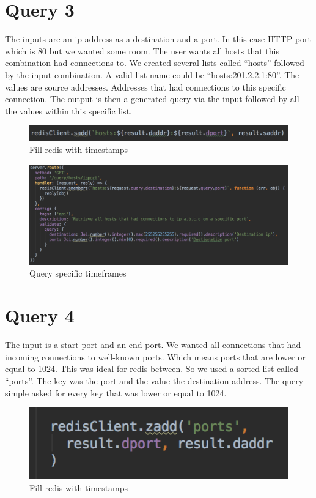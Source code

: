 \section{Query 3}
The inputs are an ip address as a destination and a port. In this case HTTP port which is 80 but we wanted some room. The user wants all hosts that this combination had connections to. We created several lists called “hosts” followed by the input combination. A valid list name could be “hosts:201.2.2.1:80”. The values are source addresses. Addresses that had connections to this specific connection. The output is then a generated query via the input followed by all the values within this specific list.

  \begin{figure}[htb!]
	\centerline{\includegraphics[width=1.0\textwidth]{resources/solution2-6.png}}
	\caption{Fill redis with timestamps}
	\label{query3}
\end{figure}

\begin{figure}[htb!]
	\centerline{\includegraphics[width=1.0\textwidth]{resources/solution2-7.png}}
	\caption{Query specific timeframes}
	\label{query33}
\end{figure}

\section{Query 4}
The input is a start port and an end port. We wanted all connections that had incoming connections to well-known ports. Which means ports that are lower or equal to 1024. This was ideal for redis between. So we used a sorted list called “ports”. The key was the port and the value the destination address. The query simple asked for every key that was lower or equal to 1024.

  \begin{figure}[htb!]
	\centerline{\includegraphics[width=1.0\textwidth]{resources/solution2-8.png}}
	\caption{Fill redis with timestamps}
	\label{query4}
\end{figure}

